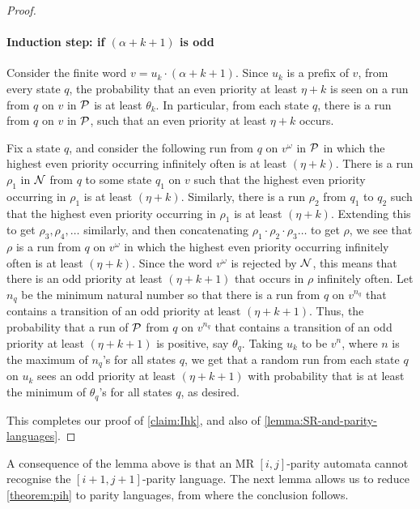 \begin{proof}
\paragraph*{Induction step: if $(\alpha+k+1)$ is odd} 

Consider the finite word $v=u_k \cdot (\alpha+k+1)$. Since $u_k$ is a prefix of $v$, from every state $q$, the probability that an even priority at least $\eta+k$ is seen on a run from $q$ on $v$ in $\mathcal{P}$ is at least $\theta_k$. In particular, from each state $q$, there is a run from $q$ on $v$ in $\mathcal{P}$, such that an even priority at least $\eta+k$ occurs.  

Fix a state $q$, and consider the following run from $q$ on $v^{\omega}$ in $\mathcal{P}$ in which the highest even priority occurring infinitely often is at least $(\eta+k)$. There is a run $\rho_1$ in $\mathcal{N}$ from $q$ to some state $q_1$ on $v$ such that the highest even priority occurring in $\rho_1$ is at least $(\eta+k)$. Similarly, there is a run $\rho_2$ from $q_1$ to $q_2$ such that the highest even priority occurring in $\rho_1$ is at least $(\eta+k)$. Extending this to get $\rho_3,\rho_4,\dots$ similarly, and then concatenating $\rho_1 \cdot \rho_2 \cdot \rho_3 \dots$ to get $\rho$, we see that $\rho$ is a run from $q$ on $v^{\omega}$ in which the highest even priority occurring infinitely often is at least $(\eta+k)$. Since the word $v^{\omega}$ is rejected by $\mathcal{N}$, this means that there is an odd priority at least $(\eta+k+1)$ that occurs in $\rho$ infinitely often. Let $n_q$ be the minimum natural number so that there is a run from $q$ on $v^{n_q}$ that contains a transition of an odd priority at least $(\eta+k+1)$. Thus, the probability that a run of $\mathcal{P}$ from $q$ on $v^{n_q}$ that contains a transition of an odd priority at least $(\eta+k+1)$ is positive, say $\theta_q$. Taking $u_k$ to be $v^{n}$, where  $n$ is the maximum of $n_q$'s for all states $q$, we get that a random run from each state $q$ on $u_k$ sees an odd priority at least $(\eta+k+1)$ with probability that is at least the minimum of $\theta_q$'s for all states $q$, as desired.  

This completes our proof of \cref{claim:Ihk}, and also of \cref{lemma:SR-and-parity-languages}.
\end{proof}


A consequence of the lemma above is that an MR $[i,j]$-parity automata cannot recognise the $[i+1,j+1]$-parity language.  The next lemma allows us to reduce  \cref{theorem:pih} to parity languages, from where the conclusion follows.

